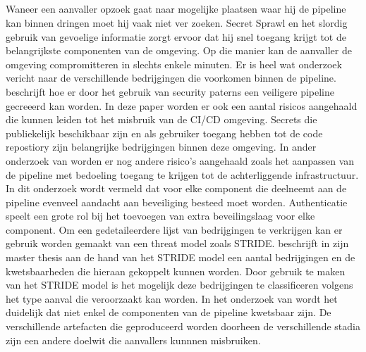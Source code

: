 \subsection{}
\label{sec:Bedrijgingen in de pipeline}
Waneer een aanvaller opzoek gaat naar mogelijke plaatsen waar hij de pipeline kan binnen dringen moet hij vaak niet ver zoeken. Secret Sprawl en het slordig gebruik van gevoelige informatie zorgt ervoor dat hij snel toegang krijgt tot de belangrijkste componenten van de omgeving. Op die manier kan de aanvaller de omgeving compromitteren in slechts enkele minuten. \autocite{Smart2022} Er is heel wat onderzoek vericht naar de verschillende bedrijgingen die voorkomen binnen de pipeline. \textcite{Rimba2015} beschrijft hoe er door het gebruik van security paterns een veiligere pipeline gecreeerd kan worden. In deze paper worden er ook een aantal risicos aangehaald die kunnen leiden tot het misbruik van de CI/CD omgeving. Secrets die publiekelijk beschikbaar zijn en als gebruiker toegang hebben tot de code repostiory zijn belangrijke bedrijgingen binnen deze omgeving. In ander onderzoek van \textcite{Ullah2017} worden er nog andere risico's aangehaald zoals het aanpassen van de pipeline met bedoeling toegang te krijgen tot de achterliggende infrastructuur. In dit onderzoek wordt vermeld dat voor elke component die deelneemt aan de pipeline evenveel aandacht aan beveiliging besteed moet worden. Authenticatie speelt een grote rol bij het toevoegen van extra beveilingslaag voor elke component. Om een gedetaileerdere lijst van bedrijgingen te verkrijgen kan er gebruik worden gemaakt van een threat model zoals STRIDE. \textcite{Paule2018} beschrijft in zijn master thesis aan de hand van het STRIDE model een aantal bedrijgingen en de kwetsbaarheden die hieraan gekoppelt kunnen worden. Door gebruik te maken van het STRIDE model is het mogelijk deze bedrijgingen te classificeren volgens het type aanval die veroorzaakt kan worden. In het onderzoek van \textcite{Paule2018} wordt het duidelijk dat niet enkel de componenten van de pipeline kwetsbaar zijn. De verschillende artefacten die geproduceerd worden doorheen de verschillende stadia zijn een andere doelwit die aanvallers kunnnen misbruiken. 

